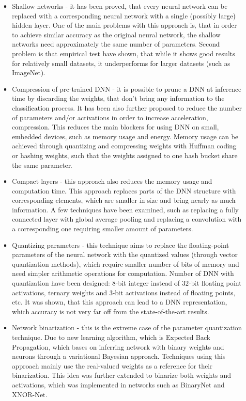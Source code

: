 \documentclass[licencjacka]{pracamgr}
\begin{document}
	\begin{itemize}
		\item Shallow networks - it has been proved, that every neural network can be replaced with a corresponding neural network with a single (possibly large) hidden layer. One of the main problems with this approach is, that in order to achieve similar accuracy as the original neural network, the shallow networks need approximately the same number of parameters. Second problem is that empirical test have shown, that while it shows good results for relatively small datasets, it underperforms for larger datasets (such as ImageNet).
		\item Compression of pre-trained DNN - it is possible to prune a DNN at inference time by discarding the weights, that don’t bring any information to the classification process. It has been also further proposed to reduce the number of parameters and/or activations in order to increase acceleration, compression. This reduces the main blockers for using DNN on small, embedded devices, such as memory usage and energy. Memory usage can be achieved through quantizing and compressing weights with Huffman coding or hashing weights, such that the weights assigned to one hash bucket share the same parameter.
		\item Compact layers - this approach also reduces the memory usage and computation time. This approach replaces parts of the DNN structure with corresponding elements, which are smaller in size and bring nearly as much information. A few techniques have been examined, such as replacing a fully connected layer with global average pooling and replacing a convolution with a corresponding one requiring smaller amount of parameters.
		\item Quantizing parameters - this technique aims to replace the floating-point parameters of the neural network with the quantized values (through vector quantization methods), which require smaller number of bits of memory and need simpler arithmetic operations for computation. Number of DNN with quantization have been designed: 8-bit integer instead of 32-bit floating point activations, ternary weights and 3-bit activations instead of floating points, etc. It was shown, that this approach can lead to a DNN representation, which accuracy is not very far off from the state-of-the-art results.
		\item Network binarization - this is the extreme case of the parameter quantization technique. Due to new learning algorithm, which is Expected Back Propagation, which bases on inferring network with binary weights and neurons through a variational Bayesian approach. Techniques using this approach mainly use the real-valued weights as a reference for their binarization. This idea was further extended to binarize both weights and activations, which was implemented in networks such as BinaryNet and XNOR-Net.
	\end{itemize}
\end{document}
